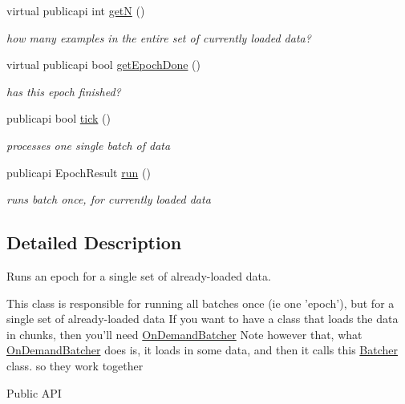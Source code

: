 \begin{DoxyCompactItemize}
virtual publicapi int \hyperlink{classBatcher_ae1bcb776d55a399fc91ef70b43b753d5}{get\-N} ()
\begin{DoxyCompactList}\small\item\em how many examples in the entire set of currently loaded data? \end{DoxyCompactList}\item 
virtual publicapi bool \hyperlink{classBatcher_a9f71c218e242b55bcd490379cc20e7ac}{get\-Epoch\-Done} ()
\begin{DoxyCompactList}\small\item\em has this epoch finished? \end{DoxyCompactList}\item 
publicapi bool \hyperlink{classBatcher_afb1f812a7b9b3e45ae57d235c912d754}{tick} ()
\begin{DoxyCompactList}\small\item\em processes one single batch of data \end{DoxyCompactList}\item 
publicapi Epoch\-Result \hyperlink{classBatcher_a51d5f36d326bdc32926abd8aa5b0d22e}{run} ()
\begin{DoxyCompactList}\small\item\em runs batch once, for currently loaded data \end{DoxyCompactList}\end{DoxyCompactItemize}


\subsection{Detailed Description}
Runs an epoch for a single set of already-\/loaded data. 

This class is responsible for running all batches once (ie one 'epoch'), but for a single set of already-\/loaded data If you want to have a class that loads the data in chunks, then you'll need \hyperlink{classOnDemandBatcher}{On\-Demand\-Batcher} Note however that, what \hyperlink{classOnDemandBatcher}{On\-Demand\-Batcher} does is, it loads in some data, and then it calls this \hyperlink{classBatcher}{Batcher} class. so they work together \begin{DoxyParagraph}{Public A\-P\-I}

\end{DoxyParagraph}


